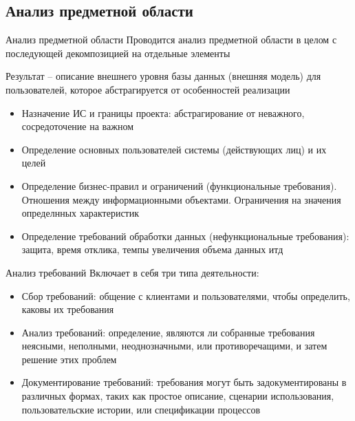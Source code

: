 \documentclass[12pt]{article}
\begin{document}
\newpage 

\subsection{Анализ предметной области}

\begin{nota}{Анализ предметной области}
    Проводится анализ предметной области в целом с последующей декомпозицией на отдельные элементы 

    Результат -- описание внешнего уровня базы данных (внешняя модель) для пользователей, которое абстрагируется от особенностей реализации 

    \begin{itemize}
        \item Назначение ИС и границы проекта: абстрагирование от неважного, сосредоточение на важном 
        \item Определение основных пользователей системы (действующих лиц) и их целей 
        \item Определение бизнес-правил и ограничений (функциональные требования). Отношения между информационными объектами. Ограничения на значения определнных характеристик 
        \item Определение требований обработки данных (нефункциональные требования): защита, время отклика, темпы увеличения объема данных итд 
    \end{itemize}
\end{nota}

\begin{nota}{Анализ требований}
    Включает в себя три типа деятельности:

    \begin{itemize}
        \item Сбор требований: общение с клиентами и пользователями, чтобы определить, каковы их требования 
        \item Анализ требований: определение, являются ли собранные требования неясными, неполными, неоднозначными, или противоречащими, и затем решение этих проблем 
        \item Документирование требований: требования могут быть задокументированы в различных формах, таких как простое описание, сценарии использования, пользовательские истории, или спецификации процессов 
    \end{itemize}
\end{nota}
\end{document}
